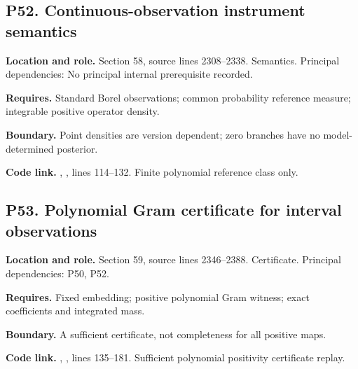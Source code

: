\documentclass[11pt,oneside,openany]{book}
\numberwithin{equation}{section}
\begin{document}
\par\noindent\begin{minipage}{\textwidth}
\subsection{P52. Continuous-observation instrument
semantics}\label{LSMRegister:p52.-continuous-observation-instrument-semantics}

\textbf{Location and role.} Section 58, source lines 2308--2338.
Semantics. Principal dependencies: No principal internal prerequisite
recorded.

\textbf{Requires.} Standard Borel observations; common probability
reference measure; integrable positive operator density.

\textbf{Boundary.} Point densities are version dependent; zero branches
have no model-determined posterior.

\textbf{Code link.} ,
, lines 114--132. Finite polynomial reference
class only.
\end{minipage}\par\medskip

\par\noindent\begin{minipage}{\textwidth}
\subsection{P53. Polynomial Gram certificate for interval
observations}\label{LSMRegister:p53.-polynomial-gram-certificate-for-interval-observations}

\textbf{Location and role.} Section 59, source lines 2346--2388.
Certificate. Principal dependencies: P50, P52.

\textbf{Requires.} Fixed embedding; positive polynomial Gram witness;
exact coefficients and integrated mass.

\textbf{Boundary.} A sufficient certificate, not completeness for all
positive maps.

\textbf{Code link.} ,
, lines 135--181. Sufficient polynomial
positivity certificate replay.
\end{minipage}\par\medskip
\end{document}
